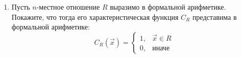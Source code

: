 \documentclass[10pt,a4paper,oneside]{article}
\begin{document}
\begin{enumerate}

\item Пусть $n$-местное отношение $R$ выразимо в формальной арифметике. Покажите, что
тогда его характеристическая функция $C_R$ представима в формальной арифметике:
$$C_R(\overrightarrow{x}) = \left\{\begin{array}{ll}1,& \overrightarrow{x}\in R\\0, &\text{иначе}\end{array}\right.$$


\end{enumerate}
\end{document}
